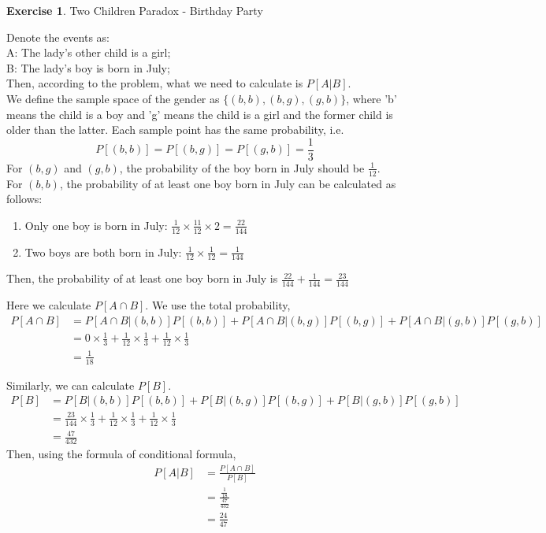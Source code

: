 \documentclass[12pt,a4paper]{article}
\makeatletter
\theoremstyle{definition}
\newtheorem{exercise}{Exercise}
\newtheorem*{solution}{Solution}
\renewenvironment{solution}[1][Solution] {\par\pushQED{\qed}\normalfont\topsep6\p@\@plus6\p@\relax\trivlist\item[\hskip\labelsep\bfseries#1\@addpunct{.}]\ignorespaces}{\popQED\endtrivlist\@endpefalse} \makeatother
\makeatother
\begin{document}
\begin{exercise}
   Two Children Paradox - Birthday Party\\
   \begin{solution}
Denote the events as:\\
A: The lady's other child is a girl;\\
B: The lady's boy is born in July;\\
Then, according to the problem, what we need to calculate is $P[A|B]$.\\
We define the sample space of the gender as $\{(b,b),(b,g),(g,b)\}$, where 'b' means the child is a boy and 'g' means the child is a girl and the former child is older than the latter. Each sample point has the same probability, i.e. $$P[(b,b)]=P[(b,g)]=P[(g,b)]=\frac{1}{3}$$
For $(b,g)$ and $(g,b)$, the probability of the boy born in July should be $\frac{1}{12}$.\\
For $(b,b)$, the probability of at least one boy born in July can be calculated as follows:
\begin{enumerate}[label=\roman*)]
    \item Only one boy is born in July: $\frac{1}{12}\times\frac{11}{12}\times 2=\frac{22}{144}$
    \item Two boys are both born in July: $\frac{1}{12}\times\frac{1}{12}=\frac{1}{144}$
\end{enumerate}
Then, the probability of at least one boy born in July is $\frac{22}{144}+\frac{1}{144}=\frac{23}{144}$
   \end{solution}

Here we calculate $P[A\cap B]$. We use the total probability,
\begin{equation*}
    \begin{split}
    P[A\cap B]&=P[A\cap B|(b,b)]P[(b,b)]+P[A\cap B|(b,g)]P[(b,g)]+P[A\cap B|(g,b)]P[(g,b)]\\
    &=0\times \frac{1}{3}+\frac{1}{12}\times \frac{1}{3}+\frac{1}{12}\times\frac{1}{3}\\
    &=\frac{1}{18}
    \end{split}
\end{equation*}

Similarly, we can calculate $P[B]$.
\begin{equation*}
\begin{split}
    P[B]&=P[B|(b,b)]P[(b,b)]+P[B|(b,g)]P[(b,g)]+P[B|(g,b)]P[(g,b)]\\
    &=\frac{23}{144}\times \frac{1}{3}+\frac{1}{12}\times\frac{1}{3}+\frac{1}{12}\times\frac{1}{3}\\
    &=\frac{47}{432}
\end{split}
\end{equation*}
Then, using the formula of conditional formula,
\begin{align*}
    P[A|B]&=\frac{P[A\cap B]}{P[B]}\\
    &=\frac{\frac{1}{18}}{\frac{47}{432}}\\
    &=\frac{24}{47}
\end{align*}
\end{exercise}
\end{document}
